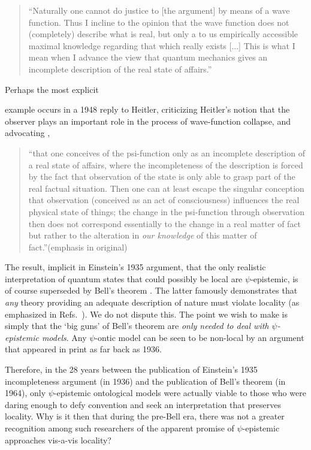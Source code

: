 \documentclass[aps,nofootinbib,12pt]{revtex4-2}
\begin{document}
\begin{quote}
``Naturally one cannot do justice to [the argument] by means of a
wave function. Thus I incline to the opinion that the wave function
does not (completely) describe what is real, but only a to us
empirically accessible maximal knowledge regarding that which really
exists [...] This is what I mean when I advance the view that
quantum mechanics gives an incomplete description of the real state
of affairs.''
\end{quote}

Perhaps the most explicit \strut example occurs in a 1948 reply to
Heitler, criticizing Heitler's notion that the observer plays an
important role in the process of wave-function collapse, and
advocating \cite{EtoHeitler},

\begin{quote}
\textquotedblleft that one conceives of the psi-function only as an
incomplete description of a real state of affairs, where the
incompleteness of the description is forced by the fact that
observation of the state is only able to grasp part of the real
factual situation. Then one can at least escape the singular
conception that observation (conceived as an act of consciousness)
influences the real physical state of things; the change in the
psi-function through observation then does not correspond
essentially to the change in a real matter of fact but rather to the
alteration in \textit{our knowledge} of this matter of
fact.\textquotedblright (emphasis in original)
\end{quote}


The result, implicit in Einstein's 1935 argument, that the only
realistic interpretation of quantum states that could possibly be
local are $\psi$-epistemic, is of course superseded by Bell's
theorem \cite{Bell_locality}. The latter famously demonstrates that
\textit{any} theory providing an adequate description of nature must
violate locality (as emphasized in
Refs.~\cite{norsen_blrealism,norsen_epr}). We do not dispute this.
The point we wish to make is simply that the `big guns' of Bell's
theorem are \textit{only needed to deal with $\psi $-epistemic
models}. Any $\psi$-ontic model can be seen to be non-local by an
argument that appeared in print as far back as 1936.

Therefore, in the 28 years between the publication of Einstein's
1935 incompleteness argument (in 1936) and the publication of Bell's
theorem (in 1964), only $\psi$-epistemic ontological models were
actually viable to those who were daring enough to defy convention
and seek an interpretation that preserves locality. Why is it then
that during the pre-Bell era, there was not a greater recognition
among such researchers of the apparent promise of $\psi$-epistemic
approaches vis-a-vis locality?
\end{document}
